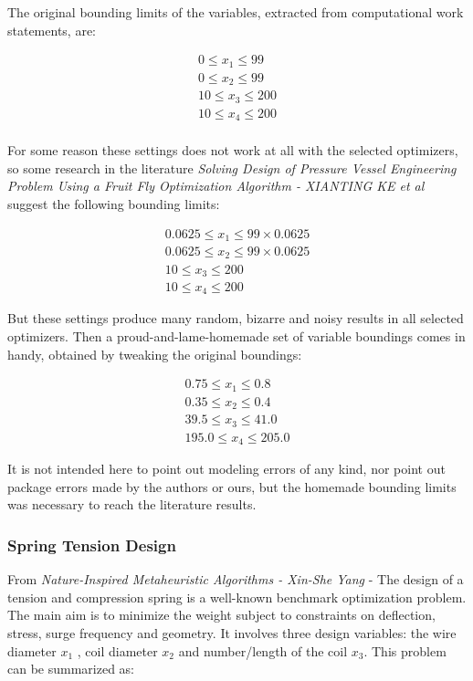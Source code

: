 \documentclass[conference]{IEEEtran}
\begin{document}
The original bounding limits of the variables, extracted from computational work
statements, are:

\begin{equation}
    \begin{split}
        0 \leq x_1 \leq 99\\
        0 \leq x_2 \leq 99\\
        10 \leq x_3 \leq 200\\
        10 \leq x_4 \leq 200\\
    \end{split}
\end{equation}

For some reason these settings does not work at all with the selected optimizers, so
some research in the literature \textit{Solving Design of Pressure Vessel Engineering
Problem Using a Fruit Fly Optimization Algorithm - XIANTING KE et al} suggest the
following bounding limits:

\begin{equation}
    \begin{split}
        0.0625 \leq x_1 \leq 99 \times 0.0625\\
        0.0625 \leq x_2 \leq 99 \times 0.0625\\
        10 \leq x_3 \leq 200\\
        10 \leq x_4 \leq 200
    \end{split}
\end{equation}

But these settings produce many random, bizarre and noisy results in all selected optimizers. Then
a proud-and-lame-homemade set of variable boundings comes in handy, obtained by tweaking the original
boundings:

\begin{equation}
    \begin{split}
        0.75 \leq x_1 \leq 0.8\\
        0.35 \leq x_2 \leq 0.4\\
        39.5 \leq x_3 \leq 41.0\\
        195.0 \leq x_4 \leq 205.0
    \end{split}
\end{equation}

It is not intended here to point out modeling errors of any kind, nor point out package
errors made by the authors or ours, but the homemade bounding limits was necessary to
reach the literature results.


\subsubsection{Spring Tension Design}
\label{subsubsec:methodology-spring-tension-design}
From \textit{Nature-Inspired Metaheuristic Algorithms - Xin-She Yang} -
The design of a tension and compression spring is a well-known benchmark
optimization problem.
The main aim is to minimize the weight subject
to constraints on deflection, stress, surge frequency and geometry. It involves
three design variables: the wire diameter $x_1$ , coil diameter $x_2$ and
number/length of the coil $x_3$.
This problem can be summarized as:
\end{document}
